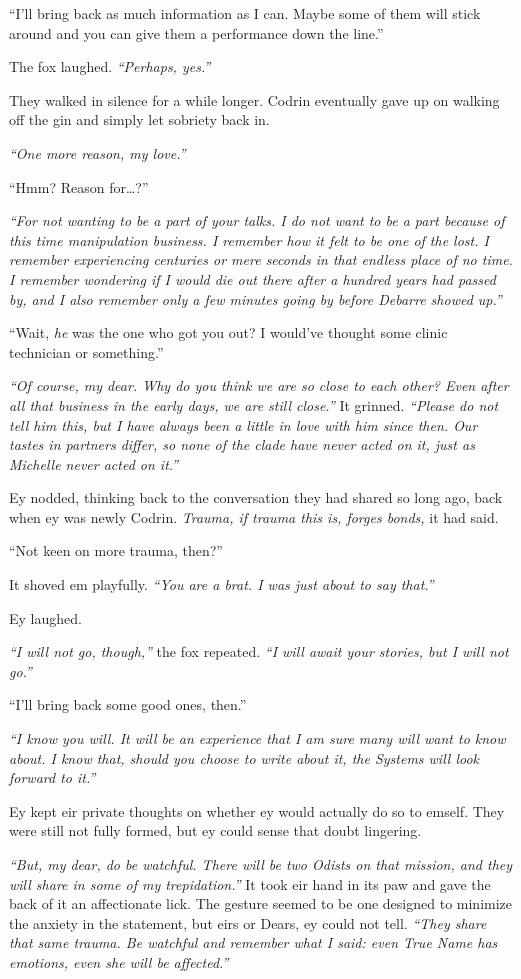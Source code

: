 ``I'll bring back as much information as I can. Maybe some of them will stick around and you can give them a performance down the line.''

The fox laughed. \emph{``Perhaps, yes.''}

They walked in silence for a while longer. Codrin eventually gave up on walking off the gin and simply let sobriety back in.

\emph{``One more reason, my love.''}

``Hmm? Reason for\ldots?''

\emph{``For not wanting to be a part of your talks. I do not want to be a part because of this time manipulation business. I remember how it felt to be one of the lost. I remember experiencing centuries or mere seconds in that endless place of no time. I remember wondering if I would die out there after a hundred years had passed by, and I also remember only a few minutes going by before Debarre showed up.''}

``Wait, \emph{he} was the one who got you out? I would've thought some clinic technician or something.''

\emph{``Of course, my dear. Why do you think we are so close to each other? Even after all that business in the early days, we are still close.''} It grinned. \emph{``Please do not tell him this, but I have always been a little in love with him since then. Our tastes in partners differ, so none of the clade have never acted on it, just as Michelle never acted on it.''}

Ey nodded, thinking back to the conversation they had shared so long ago, back when ey was newly Codrin. \emph{Trauma, if trauma this is, forges bonds,} it had said.

``Not keen on more trauma, then?''

It shoved em playfully. \emph{``You are a brat. I was just about to say that.''}

Ey laughed.

\emph{``I will not go, though,''} the fox repeated. \emph{``I will await your stories, but I will not go.''}

``I'll bring back some good ones, then.''

\emph{``I know you will. It will be an experience that I am sure many will want to know about. I know that, should you choose to write about it, the Systems will look forward to it.''}

Ey kept eir private thoughts on whether ey would actually do so to emself. They were still not fully formed, but ey could sense that doubt lingering.

\emph{``But, my dear, do be watchful. There will be two Odists on that mission, and they will share in some of my trepidation.''} It took eir hand in its paw and gave the back of it an affectionate lick. The gesture seemed to be one designed to minimize the anxiety in the statement, but eirs or Dears, ey could not tell. \emph{``They share that same trauma. Be watchful and remember what I said: even True Name has emotions, even she will be affected.''}
